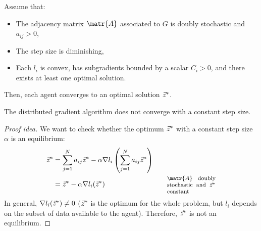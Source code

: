 \begin{description}
        \begin{theorem} 
            Assume that:
            \begin{itemize}
                \item The adjacency matrix $\matr{A}$ associated to $G$ is doubly stochastic and $a_{ij} > 0$,
                \item The step size is diminishing,
                \item Each $l_i$ is convex, has subgradients bounded by a scalar $C_i > 0$, and there exists at least one optimal solution.
            \end{itemize}
            Then, each agent converges to an optimal solution ${\vec{z}}^*$.
        \end{theorem}
\end{description}


\begin{theorem}
    The distributed gradient algorithm does not converge with a constant step size.

    \begin{proof}[Proof idea]

        We want to check whether the optimum ${\vec{z}}^*$ with a constant step size $\alpha$ is an equilibrium:
        \[
            \begin{aligned}
                \z^* &= \sum_{j=1}^N a_{ij} \z^* - \alpha \nabla l_i \left( \sum_{j=1}^N a_{ij} \z^* \right) \\
                &= \z^* - \alpha \nabla l_i (\z^*) &&& \parbox{0.20\linewidth}{\footnotesize $\matr{A}$ doubly stochastic and $\z^*$ constant} \\
            \end{aligned}
        \]
        In general, $\nabla l_i({\vec{z}}^*) \neq 0$ (${\vec{z}}^*$ is the optimum for the whole problem, but $l_i$ depends on the subset of data available to the agent). Therefore, ${\vec{z}}^*$ is not an equilibrium.
    \end{proof}
\end{theorem}


